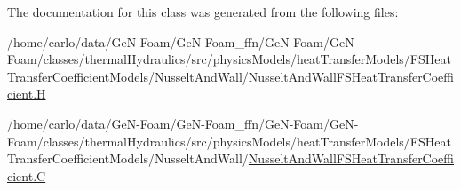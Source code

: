 The documentation for this class was generated from the following files\+:\begin{DoxyCompactItemize}
\item 
/home/carlo/data/\+Ge\+N-\/\+Foam/\+Ge\+N-\/\+Foam\+\_\+ffn/\+Ge\+N-\/\+Foam/\+Ge\+N-\/\+Foam/classes/thermal\+Hydraulics/src/physics\+Models/heat\+Transfer\+Models/\+F\+S\+Heat\+Transfer\+Coefficient\+Models/\+Nusselt\+And\+Wall/\hyperlink{NusseltAndWallFSHeatTransferCoefficient_8H}{Nusselt\+And\+Wall\+F\+S\+Heat\+Transfer\+Coefficient.\+H}\item 
/home/carlo/data/\+Ge\+N-\/\+Foam/\+Ge\+N-\/\+Foam\+\_\+ffn/\+Ge\+N-\/\+Foam/\+Ge\+N-\/\+Foam/classes/thermal\+Hydraulics/src/physics\+Models/heat\+Transfer\+Models/\+F\+S\+Heat\+Transfer\+Coefficient\+Models/\+Nusselt\+And\+Wall/\hyperlink{NusseltAndWallFSHeatTransferCoefficient_8C}{Nusselt\+And\+Wall\+F\+S\+Heat\+Transfer\+Coefficient.\+C}\end{DoxyCompactItemize}
